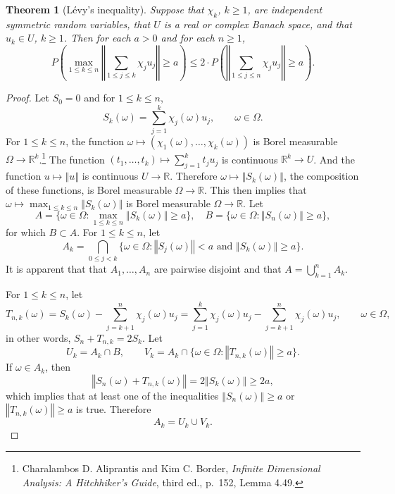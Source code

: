 \documentclass{article}
\newcommand{\norm}[1]{\left\Vert #1 \right\Vert}
\newtheorem{theorem}{Theorem}
\theoremstyle{definition}
\begin{document}
\begin{theorem}[L\'evy's inequality]
Suppose that $\chi_k$, $k \geq 1$, are independent symmetric random variables, that $U$ is a real or complex Banach space, and that
$u_k \in U$, $k \geq 1$. Then for each $a>0$ and for each $n \geq 1$,
\[
P\left(\max_{1 \leq k \leq n} \norm{\sum_{1 \leq j \leq k} \chi_j u_j} \geq a\right) \leq 2\cdot P\left(\norm{\sum_{1 \leq j \leq n} \chi_j u_j}
\geq a\right).
\]
\label{levy}
\end{theorem}
\begin{proof}
Let $S_0=0$ and for $1 \leq k \leq n$,
\[
S_k(\omega) = \sum_{j=1}^k \chi_j(\omega) u_j, \qquad \omega \in \Omega.
\]
For $1 \leq k \leq n$, the function $\omega \mapsto (\chi_1(\omega),\ldots,\chi_k(\omega))$ is Borel measurable
$\Omega \to \mathbb{R}^k$.\footnote{Charalambos D. Aliprantis
and Kim C. Border, {\em Infinite Dimensional Analysis: A Hitchhiker's Guide}, third ed., p.~152, Lemma 4.49.}
The function $(t_1,\ldots,t_k) \mapsto \sum_{j=1}^k t_j u_j$ is continuous $\mathbb{R}^k \to U$. And the function
$u \mapsto \norm{u}$ is continuous $U \to \mathbb{R}$. Therefore $\omega \mapsto 
\norm{S_k(\omega)}$, the composition of these functions, is Borel measurable $\Omega \to \mathbb{R}$. 
This then implies that $\omega \mapsto \max_{1 \leq k \leq n} \norm{S_k(\omega)}$ is Borel measurable $\Omega \to \mathbb{R}$. 
Let 
\[
A = \{\omega \in \Omega: \max_{1 \leq k \leq n} \norm{S_k(\omega)} \geq a\},
\quad B = \{\omega \in \Omega: \norm{S_n(\omega)} \geq a\},
\]
for which $B \subset A$.
For $1 \leq k \leq n$, let
\[
A_k = \bigcap_{0 \leq j < k} \{\omega \in \Omega: \textrm{$\norm{S_j(\omega)}<a$ and $\norm{S_k(\omega)} \geq a$}\}.
\]
It is apparent that 
that
$A_1,\ldots,A_n$ are pairwise disjoint and that $A = \bigcup_{k=1}^n A_k$. 

For $1 \leq k \leq n$, let
\[
T_{n,k}(\omega) = S_k(\omega) - \sum_{j=k+1}^n \chi_j(\omega) u_j
=\sum_{j=1}^k \chi_j(\omega) u_j - \sum_{j=k+1}^n \chi_j(\omega)u_j, \qquad \omega \in \Omega,
\]
in other words, $S_n+T_{n,k}=2S_k$. 
Let 
\[
U_k  = A_k \cap B,\qquad 
V_k = A_k \cap \{\omega \in \Omega: \norm{T_{n,k}(\omega)} \geq a\}.
\]
If $\omega \in A_k$, then 
\[
\norm{S_n(\omega)+T_{n,k}(\omega)} = 2\norm{S_k(\omega)}
\geq 2a,
\]
which implies that at least one of the inequalities $\norm{S_n(\omega)} \geq a$ or $\norm{T_{n,k}(\omega)} \geq a$ is true. Therefore
\[
A_k = U_k \cup V_k.
\]


\end{proof}
\end{document}
